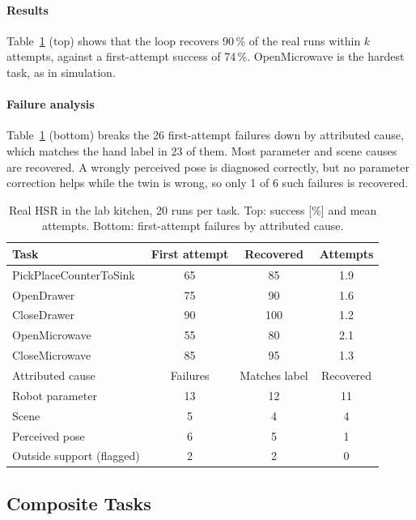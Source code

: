 \documentclass[letterpaper, 10 pt, conference]{ieeeconf}
\newcommand{\dummystyle}{\color{dummy}}
\newcommand{\dummystyle}{}
\newcommand{\dummy}[1]{{\dummystyle #1}}
\begin{document}
\paragraph*{Results}
Table~\ref{tab:real} (top) shows that the loop recovers \dummy{90}\,\% of the
real runs within $k$ attempts, against a first-attempt success of
\dummy{74}\,\%. OpenMicrowave is the hardest task, as in simulation.

\paragraph*{Failure analysis}
Table~\ref{tab:real} (bottom) breaks the \dummy{26} first-attempt failures down
by attributed cause, which matches the hand label in \dummy{23} of them. Most
parameter and scene causes are recovered. A wrongly perceived pose is diagnosed
correctly, but no parameter correction helps while the twin is wrong, so only
\dummy{1} of \dummy{6} such failures is recovered.

\begin{table}[t]
  \centering
  \caption{Real HSR in the lab kitchen, \dummy{20} runs per task. Top: success
  [\%] and mean attempts. Bottom: first-attempt failures by attributed cause.}
  \label{tab:real}
  \setlength{\tabcolsep}{4pt}
  \dummystyle
  \begin{tabular}{lccc}
    \toprule
    Task & First attempt & Recovered & Attempts \\
    \midrule
    PickPlaceCounterToSink & 65 & 85  & 1.9 \\
    OpenDrawer             & 75 & 90  & 1.6 \\
    CloseDrawer            & 90 & 100 & 1.2 \\
    OpenMicrowave          & 55 & 80  & 2.1 \\
    CloseMicrowave         & 85 & 95  & 1.3 \\
    \midrule
    Attributed cause & Failures & Matches label & Recovered \\
    \midrule
    Robot parameter           & 13 & 12 & 11 \\
    Scene                     &  5 &  4 &  4 \\
    Perceived pose            &  6 &  5 &  1 \\
    Outside support (flagged) &  2 &  2 &  0 \\
    \bottomrule
  \end{tabular}
\end{table}

\subsection{Composite Tasks}
\label{sec:exp-composite}
\end{document}
